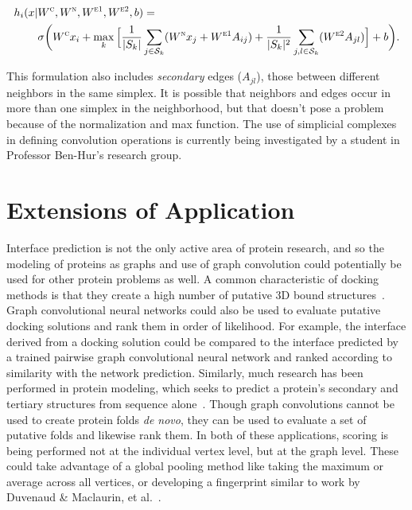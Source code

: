 \begin{equation}
\begin{split}
h_i(x |  & W^{\textsc{c}}, W^{\textsc{n}}, W^{\textsc{e1}}, W^{\textsc{e2}}, b) = \\ 
&\sigma \bigg( W^{\textsc{c}} x_i + \max_{k} \Big[ \frac{1}{|S_k|}  \sum_{j \in \mathcal{S}_k} ( W^{\textsc{n}} x_j + W^{\textsc{e1}} A_{ij} ) + \frac{1}{|S_k|^{2}}\sum_{j, l \in \mathcal{S}_k} (W^{\textsc{e2}} A_{jl}) \Big] + b \bigg).
\end{split}
\label{eq:simplicial_complex_conv}
\end{equation}

\noindent
This formulation also includes \emph{secondary} edges ($A_{jl}$), those between different neighbors in the same simplex.
It is possible that neighbors and edges occur in more than one simplex in the neighborhood, but that doesn't pose a problem because of the normalization and max function.
The use of simplicial complexes in defining convolution operations is currently being investigated by a student in Professor Ben-Hur's research group.


\section{Extensions of Application}

Interface prediction is not the only active area of protein research, and so the modeling of proteins as graphs and use of graph convolution could potentially be used for other protein problems as well.
A common characteristic of docking methods is that they create a high number of putative 3D bound structures~\cite{janin2013}.
Graph convolutional neural networks could also be used to evaluate putative docking solutions and rank them in order of likelihood.
For example, the interface derived from a docking solution could be compared to the interface predicted by a trained pairwise graph convolutional neural network and ranked according to similarity with the network prediction.
Similarly, much research has been performed in protein modeling, which seeks to predict a protein's secondary and tertiary structures from sequence alone~\cite{schwede2013}.
Though graph convolutions cannot be used to create protein folds \emph{de novo}, they can be used to evaluate a set of putative folds and likewise rank them.
In both of these applications, scoring is being performed not at the individual vertex level, but at the graph level.
These could take advantage of a global pooling method like taking the maximum or average across all vertices, or developing a fingerprint similar to work by Duvenaud \& Maclaurin, et al.~\cite{duvenaud2015}.

